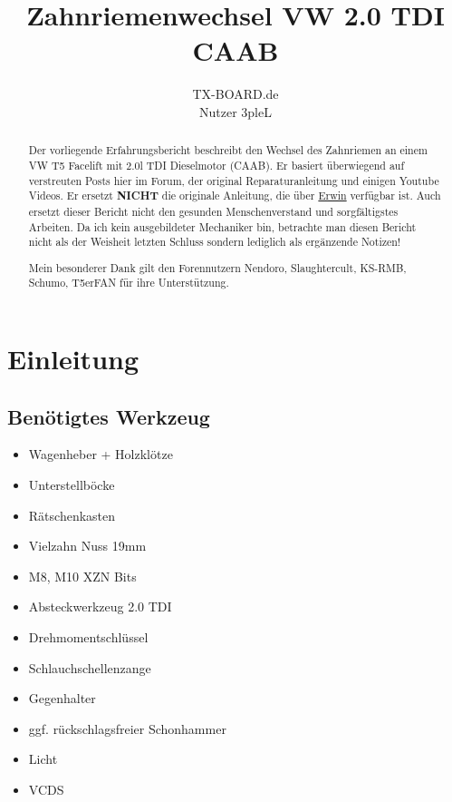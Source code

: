 \documentclass[twoside,a4paper]{refart}
\title{Zahnriemenwechsel VW 2.0 TDI CAAB}
\author{TX-BOARD.de \\Nutzer 3pleL \\}
\date{}
\begin{document}
\maketitle

\begin{abstract}
	Der vorliegende Erfahrungsbericht beschreibt den Wechsel des Zahnriemen an einem VW T5 Facelift mit 2.0l TDI Dieselmotor (CAAB). Er basiert überwiegend auf verstreuten Posts hier im Forum, der original Reparaturanleitung und einigen Youtube Videos. Er ersetzt \textbf{NICHT} die originale Anleitung, die über \href{https://erwin.volkswagen.de/erwin/showHome.do}{Erwin} verfügbar ist. Auch ersetzt dieser Bericht nicht den gesunden Menschenverstand und sorgfältigstes Arbeiten. 
	Da ich kein ausgebildeter Mechaniker bin, betrachte man diesen Bericht nicht als der Weisheit letzten Schluss sondern lediglich als ergänzende Notizen!
	
	Mein besonderer Dank gilt den Forennutzern Nendoro, Slaughtercult, KS-RMB, Schumo, T5erFAN für ihre Unterstützung. 
\end{abstract}

\tableofcontents

\newpage



\section{Einleitung}

\subsection{Benötigtes Werkzeug}
\begin{itemize}
	\item Wagenheber + Holzklötze
	\item Unterstellböcke
	\item Rätschenkasten 
	\item Vielzahn Nuss 19mm 
	\item M8, M10 XZN Bits
	\item Absteckwerkzeug 2.0 TDI 
	\item Drehmomentschlüssel
	\item Schlauchschellenzange
	\item Gegenhalter
	\item ggf. rückschlagsfreier Schonhammer
	\item Licht
	\item VCDS
\end{itemize}
\end{document}
